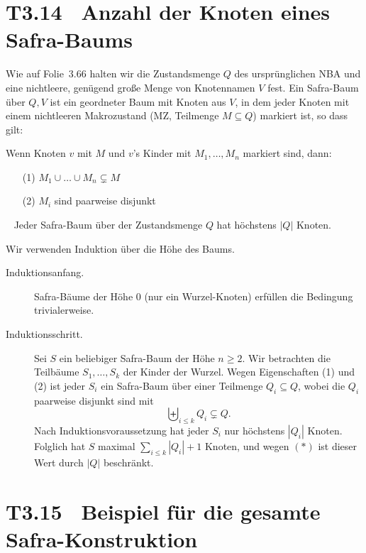 \documentclass[fontsize=11pt, twoside=false, numbers=autoenddot]{scrbook}
\begin{document}
\goodbreak
\section*{T3.14~ Anzahl der Knoten eines Safra-Baums}

Wie auf Folie~3.66 halten wir die Zustandsmenge $Q$ des ursprünglichen NBA
und eine nichtleere, genügend große Menge von Knotennamen $V$ fest.
Ein Safra-Baum über $Q,V$ ist ein geordneter Baum mit Knoten aus $V$,
in dem jeder Knoten mit einem nichtleeren Makrozustand (MZ, Teilmenge $M \subseteq Q$)
markiert ist, so dass gilt:

Wenn Knoten $v$ mit $M$ und $v$'s Kinder mit $M_1,\dots,M_n$ markiert sind, dann:
%
\begin{enumerate}
  \item[(1)]
    $M_1 \cup \dots \cup M_n \subsetneq M$
  \item[(2)]
    $M_i$ sind paarweise disjunkt
\end{enumerate}

\par\medskip\noindent
{}~ Jeder Safra-Baum über der Zustandsmenge $Q$
hat höchstens $|Q|$ Knoten.

\par\medskip\noindent
{}
Wir verwenden Induktion über die Höhe des Baums.
%
\begin{description}
  \item[Induktionsanfang.]
    Safra-Bäume der Höhe 0 (nur ein Wurzel-Knoten) erfüllen die Bedingung trivialerweise.
  \item[Induktionsschritt.]
    Sei $S$ ein beliebiger Safra-Baum der Höhe $n \geq 2$.
    Wir betrachten die Teilbäume $S_1,\dots,S_k$ der Kinder der Wurzel.
    Wegen Eigenschaften (1) und (2) ist jeder $S_i$ ein Safra-Baum
    über einer Teilmenge $Q_i \subseteq Q$,
    wobei die $Q_i$ paarweise disjunkt sind mit 
    \[
      \tag{*}
      \biguplus_{i \leq k} Q_i \subsetneq Q.
    \]
    Nach Induktionsvoraussetzung hat jeder $S_i$ nur höchstens $|Q_i|$ Knoten.
    Folglich hat $S$ maximal $\sum_{i \leq k}|Q_i| + 1$ Knoten,
    und wegen $(*)$ ist dieser Wert durch $|Q|$ beschränkt.
    \qedhere
\end{description}


\pagebreak
\section*{T3.15~ Beispiel für die gesamte Safra-Konstruktion}
\end{document}
